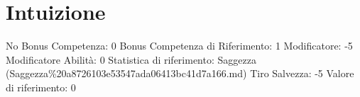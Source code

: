 \section{Intuizione}\label{intuizione}

\begin{description}
\tightlist
\item[Tags: ABI]
No Bonus Competenza: 0 Bonus Competenza di Riferimento: 1 Modificatore:
-5 Modificatore Abilità: 0 Statistica di riferimento: Saggezza
(Saggezza\%20a8726103e53547ada06413bc41d7a166.md) Tiro Salvezza: -5
Valore di riferimento: 0
\end{description}
